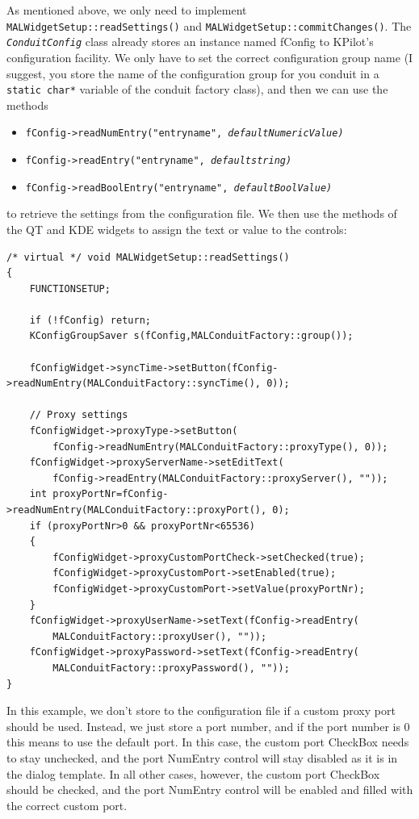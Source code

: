 \documentclass[10pt,a4paper]{article}
\newcommand{\code}[1]{{\small\texttt{#1}}}
\newcommand{\class}[1]{{\small\em\texttt{#1}}}
\begin{document}
As mentioned above, we only need to implement \code{MALWidgetSetup::readSettings()} 
and \code{MALWidgetSetup::commitChanges()}. The \class{ConduitConfig} class 
already stores an instance named fConfig to KPilot's configuration facility. 
We only have to set the correct configuration group name (I suggest, you 
store the name of the configuration group for you conduit in a \code{static 
char*} variable of the conduit factory class), and then we can use the methods
\begin{itemize}
\item \code{fConfig->readNumEntry("entryname", \em{defaultNumericValue})}
\item \code{fConfig->readEntry("entryname", \em{defaultstring})}
\item \code{fConfig->readBoolEntry("entryname", \em{defaultBoolValue})}
\end{itemize}
to retrieve the settings from the configuration file. We then use the methods of the QT and KDE widgets to assign the text or value to the controls:

{\footnotesize\begin{verbatim}
/* virtual */ void MALWidgetSetup::readSettings()
{
    FUNCTIONSETUP;

    if (!fConfig) return;
    KConfigGroupSaver s(fConfig,MALConduitFactory::group());
    
    fConfigWidget->syncTime->setButton(fConfig->readNumEntry(MALConduitFactory::syncTime(), 0));
    
    // Proxy settings
    fConfigWidget->proxyType->setButton(
        fConfig->readNumEntry(MALConduitFactory::proxyType(), 0));
    fConfigWidget->proxyServerName->setEditText(
        fConfig->readEntry(MALConduitFactory::proxyServer(), ""));
    int proxyPortNr=fConfig->readNumEntry(MALConduitFactory::proxyPort(), 0);
    if (proxyPortNr>0 && proxyPortNr<65536) 
    {
        fConfigWidget->proxyCustomPortCheck->setChecked(true);
        fConfigWidget->proxyCustomPort->setEnabled(true);
        fConfigWidget->proxyCustomPort->setValue(proxyPortNr);
    }
    fConfigWidget->proxyUserName->setText(fConfig->readEntry(
        MALConduitFactory::proxyUser(), ""));
    fConfigWidget->proxyPassword->setText(fConfig->readEntry(
        MALConduitFactory::proxyPassword(), ""));
}
\end{verbatim}
}

In this example, we don't store to the configuration file if a custom proxy port should be used. Instead, we just store a port number, and if the port number is 0 this means to use the default port. In this case, the custom port CheckBox needs to stay unchecked, and the port NumEntry control will stay disabled as it is in the dialog template. In all other cases, however, the custom port CheckBox should be checked, and the port NumEntry control will be enabled and filled with the correct custom port.
\end{document}
